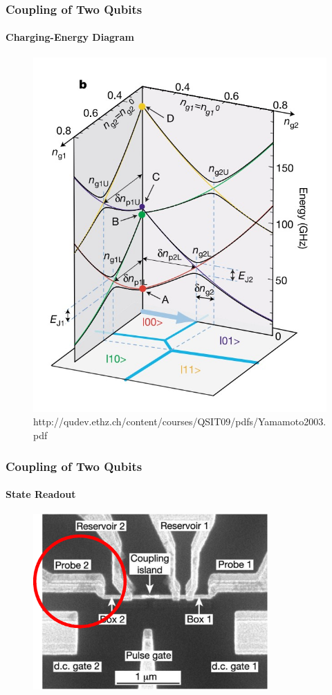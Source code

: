 \documentclass{beamer}
\begin{document}
\begin{frame}
    \frametitle{Coupling of Two Qubits}
    \framesubtitle{Charging-Energy Diagram}
    \begin{figure}[ht!]
        \centering
        \includegraphics[height=0.6\textheight]{img/charging-energy-diagram.jpg}
        \caption{http://qudev.ethz.ch/content/courses/QSIT09/pdfs/Yamamoto2003.pdf}
    \end{figure}
\end{frame}


\begin{frame}
    \frametitle{Coupling of Two Qubits}
    \framesubtitle{State Readout}
    \begin{figure}[!htb]
        \centering
        \includegraphics[width=0.8\textwidth]{img/two-qubit-sem-probe.eps}
    \end{figure}
\end{frame}
\end{document}
